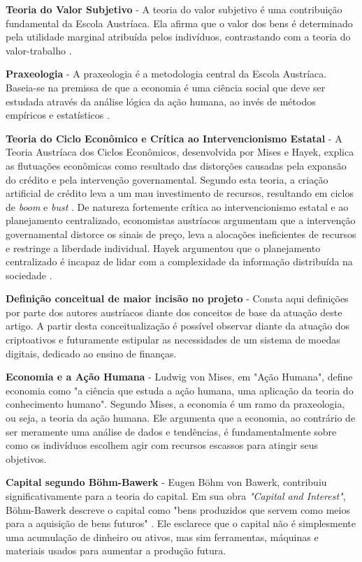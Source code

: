 \documentclass[article,12pt,oneside,a4paper,english,brazil]{unifil}
\begin{document}
\begin{Spacing}{1.5}
\textbf{Teoria do Valor Subjetivo} -
A teoria do valor subjetivo é uma contribuição fundamental da Escola Austríaca. Ela afirma que o valor dos bens é determinado pela utilidade marginal atribuída pelos indivíduos, contrastando com a teoria do valor-trabalho \cite{menger1871principles}.

\textbf{Praxeologia} -
A praxeologia é a metodologia central da Escola Austríaca. Baseia-se na premissa de que a economia é uma ciência social que deve ser estudada através da análise lógica da ação humana, ao invés de métodos empíricos e estatísticos \cite{mises1949human}.

\textbf{Teoria do Ciclo Econômico e Crítica ao Intervencionismo Estatal} -
A Teoria Austríaca dos Ciclos Econômicos, desenvolvida por Mises e Hayek, explica as flutuações econômicas como resultado das distorções causadas pela expansão do crédito e pela intervenção governamental. Segundo esta teoria, a criação artificial de crédito leva a um mau investimento de recursos, resultando em ciclos de \textit{boom} e \textit{bust} \cite{mises1949human,hayek1944road}.
De natureza fortemente crítica ao intervencionismo estatal e ao planejamento centralizado, economistas austríacos argumentam que a intervenção governamental distorce os sinais de preço, leva a alocações ineficientes de recursos e restringe a liberdade individual. Hayek argumentou que o planejamento centralizado é incapaz de lidar com a complexidade da informação distribuída na sociedade \cite{hayek1944road,hayek1960constitution}.

\textbf{Definição conceitual de maior incisão no projeto} -
Consta aqui definições por parte dos autores austríacos diante dos conceitos de base da atuação deste artigo. A partir desta conceitualização é possível observar diante da atuação dos criptoativos e futuramente estipular as necessidades de um sistema de moedas digitais, dedicado ao ensino de finanças.

\textbf{Economia e a Ação Humana} - Ludwig von Mises, em "Ação Humana"\cite{mises1949human}, define economia como "a ciência que estuda a ação humana, uma aplicação da teoria do conhecimento humano". Segundo Mises, a economia é um ramo da praxeologia, ou seja, a teoria da ação humana. Ele argumenta que a economia, ao contrário de ser meramente uma análise de dados e tendências, é fundamentalmente sobre como os indivíduos escolhem agir com recursos escassos para atingir seus objetivos.

\textbf{Capital segundo Böhm-Bawerk} - Eugen Böhm von Bawerk, contribuiu significativamente para a teoria do capital. Em sua obra \textit{"Capital and Interest"}\cite{bohm1884capital}, Böhm-Bawerk descreve o capital como "bens produzidos que servem como meios para a aquisição de bens futuros" \cite{bohm1884capital}. Ele esclarece que o capital não é simplesmente uma acumulação de dinheiro ou ativos, mas sim ferramentas, máquinas e materiais usados para aumentar a produção futura.


\end{Spacing}
\end{document}

